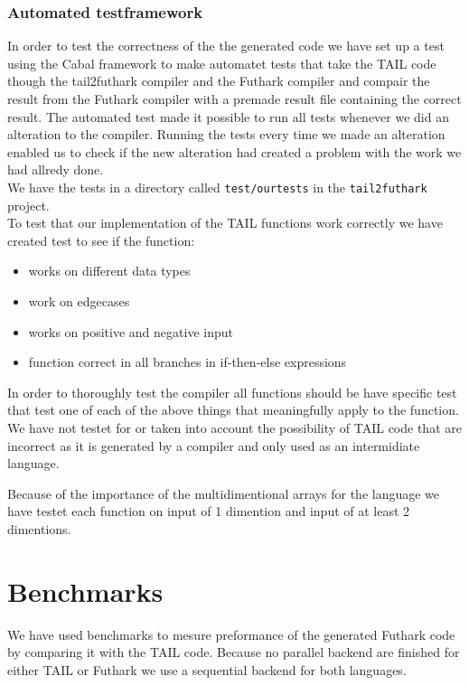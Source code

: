 \documentclass[11pt]{article}
\begin{document}
\subsubsection{Automated testframework}
In order to test the correctness of the the generated code we have set up a test using the Cabal framework to make automatet tests that take the TAIL code though the tail2futhark compiler and the Futhark compiler and compair the result from the Futhark compiler with a premade result file containing the correct result. The automated test made it possible to run all tests whenever we did an alteration to the compiler. 
Running the tests every time we made an alteration enabled us to check if the new alteration had created a problem with the work we had allredy done. \\

We have the tests in a directory called {\tt test/ourtests} in the {\tt tail2futhark} project. \\

To test that our implementation of the TAIL functions work correctly we have created test to see if the function:
\begin{itemize}
\item works on different data types
\item work on edgecases
\item works on positive and negative input
\item function correct in all branches in if-then-else expressions
\end{itemize}
In order to thoroughly test the compiler all functions should be have specific test that test one of each of the above things
that meaningfully apply to the function. \\

We have not testet for or taken into account the possibility of TAIL code that are incorrect as it is generated by a compiler and only used as an intermidiate language. 

Because of the importance of the multidimentional arrays for the language we have testet each function on input of 1 dimention and input of at least 2 dimentions. 

\section{Benchmarks}
\label{sec:benchmarks}
We have used benchmarks to mesure preformance of the generated Futhark code by comparing it with the TAIL code.
Because no parallel backend are finished for either TAIL or Futhark we use a sequential backend for both languages. \\
\end{document}
